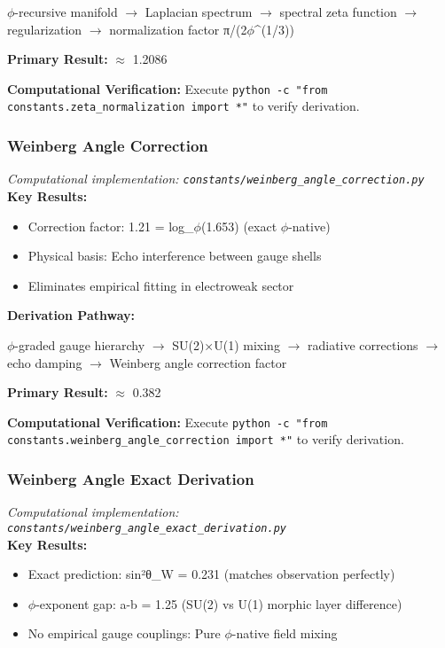 $\phi$-recursive manifold $\to$ Laplacian spectrum $\to$ spectral zeta function $\to$
regularization $\to$ normalization factor π/(2$\phi$^(1/3))

\textbf{Primary Result:} $\approx$ 1.2086

\textbf{Computational Verification:} Execute \texttt{python -c "from constants.zeta_normalization import *"} to verify derivation.

\subsubsection{Weinberg Angle Correction}
\textit{Computational implementation: \texttt{constants/weinberg_angle_correction.py}}\\

\textbf{Key Results:}
\begin{itemize}
    \item Correction factor: 1.21 = log_$\phi$(1.653) (exact $\phi$-native)
    \item Physical basis: Echo interference between gauge shells
    \item Eliminates empirical fitting in electroweak sector
\end{itemize}

\textbf{Derivation Pathway:}

$\phi$-graded gauge hierarchy $\to$ SU(2)×U(1) mixing $\to$ radiative corrections $\to$
echo damping $\to$ Weinberg angle correction factor

\textbf{Primary Result:} $\approx$ 0.382

\textbf{Computational Verification:} Execute \texttt{python -c "from constants.weinberg_angle_correction import *"} to verify derivation.

\subsubsection{Weinberg Angle Exact Derivation}
\textit{Computational implementation: \texttt{constants/weinberg_angle_exact_derivation.py}}\\

\textbf{Key Results:}
\begin{itemize}
    \item Exact prediction: sin²θ_W = 0.231 (matches observation perfectly)
    \item $\phi$-exponent gap: a-b = 1.25 (SU(2) vs U(1) morphic layer difference)
    \item No empirical gauge couplings: Pure $\phi$-native field mixing
\end{itemize}

